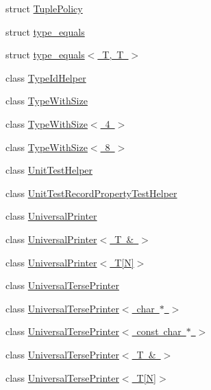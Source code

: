 \begin{DoxyCompactItemize}
\item 
struct \mbox{\hyperlink{structtesting_1_1internal_1_1TuplePolicy}{Tuple\+Policy}}
\item 
struct \mbox{\hyperlink{structtesting_1_1internal_1_1type__equals}{type\+\_\+equals}}
\item 
struct \mbox{\hyperlink{structtesting_1_1internal_1_1type__equals_3_01T_00_01T_01_4}{type\+\_\+equals$<$ T, T $>$}}
\item 
class \mbox{\hyperlink{classtesting_1_1internal_1_1TypeIdHelper}{Type\+Id\+Helper}}
\item 
class \mbox{\hyperlink{classtesting_1_1internal_1_1TypeWithSize}{Type\+With\+Size}}
\item 
class \mbox{\hyperlink{classtesting_1_1internal_1_1TypeWithSize_3_014_01_4}{Type\+With\+Size$<$ 4 $>$}}
\item 
class \mbox{\hyperlink{classtesting_1_1internal_1_1TypeWithSize_3_018_01_4}{Type\+With\+Size$<$ 8 $>$}}
\item 
class \mbox{\hyperlink{classtesting_1_1internal_1_1UnitTestHelper}{Unit\+Test\+Helper}}
\item 
class \mbox{\hyperlink{classtesting_1_1internal_1_1UnitTestRecordPropertyTestHelper}{Unit\+Test\+Record\+Property\+Test\+Helper}}
\item 
class \mbox{\hyperlink{classtesting_1_1internal_1_1UniversalPrinter}{Universal\+Printer}}
\item 
class \mbox{\hyperlink{classtesting_1_1internal_1_1UniversalPrinter_3_01T_01_6_01_4}{Universal\+Printer$<$ T \& $>$}}
\item 
class \mbox{\hyperlink{classtesting_1_1internal_1_1UniversalPrinter_3_01T[N]_4}{Universal\+Printer$<$ T\mbox{[}\+N\mbox{]}$>$}}
\item 
class \mbox{\hyperlink{classtesting_1_1internal_1_1UniversalTersePrinter}{Universal\+Terse\+Printer}}
\item 
class \mbox{\hyperlink{classtesting_1_1internal_1_1UniversalTersePrinter_3_01char_01_5_01_4}{Universal\+Terse\+Printer$<$ char $\ast$ $>$}}
\item 
class \mbox{\hyperlink{classtesting_1_1internal_1_1UniversalTersePrinter_3_01const_01char_01_5_01_4}{Universal\+Terse\+Printer$<$ const char $\ast$ $>$}}
\item 
class \mbox{\hyperlink{classtesting_1_1internal_1_1UniversalTersePrinter_3_01T_01_6_01_4}{Universal\+Terse\+Printer$<$ T \& $>$}}
\item 
class \mbox{\hyperlink{classtesting_1_1internal_1_1UniversalTersePrinter_3_01T[N]_4}{Universal\+Terse\+Printer$<$ T\mbox{[}\+N\mbox{]}$>$}}

\end{DoxyCompactItemize}
